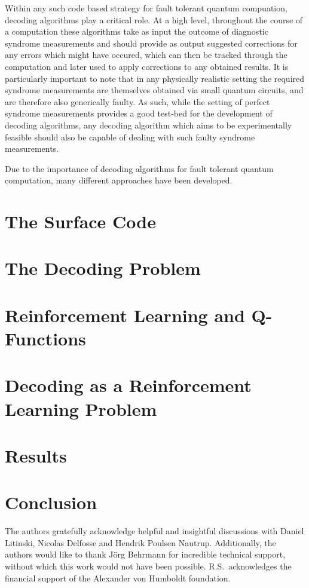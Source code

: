 \documentclass[onecolumn,preprintnumbers,amsmath,amssymb,notitlepage,nofootinbib,longbibliography,superscriptaddress]{revtex4-1}
\begin{document}
Within any such code based strategy for fault tolerant quantum compuation, decoding algorithms play a critical role. At a high level, throughout the course of a computation these algorithms take as input the outcome of diagnostic syndrome measurements and should provide as output suggested corrections for any errors which might have occured, which can then be tracked through the computation and later used to apply corrections to any obtained results. It is particularly important to note that in any physically realistic setting the required syndrome measurements are themselves obtained via small quantum circuits, and are therefore also generically faulty. As such, while the setting of perfect syndrome measurements provides a good test-bed for the development of decoding algorithms, any decoding algorithm which aims to be experimentally feasible should also be capable of dealing with such faulty syndrome measurements.

Due to the importance of decoding algorithms for fault tolerant quantum computation, many different approaches have been developed. 



\section{The Surface Code}\label{s:the_surface_code}
\section{The Decoding Problem}\label{s:the_decoding_problem}
\section{Reinforcement Learning and Q-Functions}\label{s:reinforcement_learning}
\section{Decoding as a Reinforcement Learning Problem}\label{s:decoding_as_rl}
\section{Results}\label{s:results}
\section{Conclusion}\label{s:conclusions}


\begin{acknowledgments}
The authors gratefully acknowledge helpful and insightful discussions with Daniel Litinski, Nicolas Delfosse and Hendrik Poulsen Nautrup. Additionally, the authors would like to thank J\"{o}rg Behrmann for incredible technical support, without which this work would not have been possible. R.S.\ acknowledges the financial support of the Alexander von Humboldt foundation.
\end{acknowledgments}	


\end{document}
